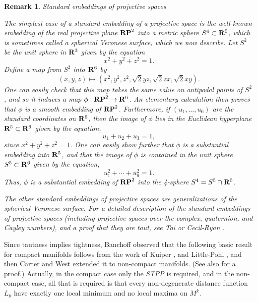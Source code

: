 \documentclass[12pt]{article}
\newtheorem{remark}{Remark}[section]
\begin{document}
\begin{remark}{Standard embeddings of projective spaces}
\label{rem:std-embeddingd-projective-spaces}

\noindent
{\rm The simplest case of a standard embedding of a projective space
is the well-known embedding of the real projective plane
${\bf RP}^2$ into a metric sphere $S^4 \subset {\bf R}^5$, which is sometimes called a {\em spherical Veronese
surface}, which we now describe.
Let $S^2$ be the unit sphere in ${\bf R}^3$ given by the equation
\begin{equation}
\label{eq:unit-sphere-r3}
x^2 + y^2 + z^2 = 1. 
\end{equation}
Define a map from $S^2$ into ${\bf R}^6$ by
\begin{equation}
\label{eq:Veronese-map-r6}
(x,y,z) \mapsto (x^2, y^2, z^2, \sqrt{2} yz, \sqrt{2} zx, \sqrt{2} xy).
\end{equation}
One can easily check that this map takes the same value on antipodal points of $S^2$, and so it induces a map $\phi: {\bf RP}^2 \rightarrow {\bf R}^6$.  An elementary calculation
then proves that $\phi$ is a smooth embedding of ${\bf RP}^2$.  Furthermore, if $(u_1,\ldots,u_6)$ are the standard coordinates on ${\bf R}^6$, then the image of $\phi$
lies in the Euclidean hyperplane ${\bf R}^5 \subset {\bf R}^6$ given by the equation,
\begin{equation}
\label{eq:Veronese-hyperplane}
u_1 + u_2 + u_3 = 1, 
\end{equation}
since $x^2 + y^2 + z^2 = 1$.  One can easily show further that $\phi$ is a substantial embedding into ${\bf R}^5$, and that the image of $\phi$ is contained in the unit
sphere $S^5 \subset {\bf R}^6$ given by the equation,
\begin{equation}
\label{eq:unit-sphere-r6}
u_1^2 + \cdots + u_6^2 = 1. 
\end{equation}
Thus, $\phi$ is a substantial embedding of ${\bf RP}^2$ into the 4-sphere $S^4 = S^5 \cap {\bf R}^5$.

The other standard embeddings of projective spaces are generalizations of the spherical Veronese surface.
For a detailed description of the standard embeddings of projective spaces (including projective spaces over the complex,
quaternion, and Cayley numbers), and a proof that they are taut,
see Tai \cite{Tai} or Cecil-Ryan \cite[pp. 74--83]{CR8}.}
\end{remark} 


Since tautness implies tightness, Banchoff \cite{Ban1}
observed that the following basic result for compact manifolds follows from the work of Kuiper \cite{Ku1}, 
and Little-Pohl \cite{LP},
and then Carter and West \cite{CW1} extended it to non-compact
manifolds. (See also \cite[p. 124]{CR7}
for a proof.) Actually, in the compact case only the {\em STPP} 
is required,
and in the non-compact case, all that is required is that every
non-degenerate distance function $L_p$ have exactly one local
minimum and no local maxima on $M^k$.\\
\end{document}
